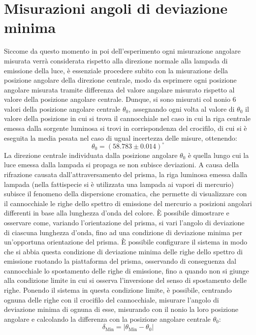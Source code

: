 \documentclass[a4paper,12pt]{article}
\begin{document}
\section{Misurazioni angoli di deviazione minima}
Siccome da questo momento in poi dell’esperimento ogni misurazione angolare misurata verrà considerata rispetto alla direzione normale alla lampada di emissione della luce, è essenziale procedere subito con la misurazione della posizione angolare della direzione centrale, modo da esprimere ogni posizione angolare misurata tramite differenza del valore angolare misurato rispetto al valore della posizione angolare centrale.
Dunque, si sono misurati col nonio 6 valori della posizione angolare centrale \( \theta_0 \), assegnando ogni volta al valore di \( \theta_0 \) il valore della posizione in cui si trova il cannocchiale nel caso in cui la riga centrale emessa dalla sorgente luminosa si trovi in corrispondenza del crocifilo, di cui si è eseguita la media pesata nel caso di ugual incertezza delle misure, ottenendo:
\[
\theta_0 = (58.783 \pm 0.014)^\circ
\]
La direzione centrale individuata dalla posizione angolare \( \theta_0 \) è quella lungo cui la luce emessa dalla lampada si propaga se non subisce deviazioni.
A causa della rifrazione causata dall’attraversamento del prisma, la riga luminosa emessa dalla lampada (nella fattispecie si è utilizzata una lampada ai vapori di mercurio) subisce il fenomeno della dispersione cromatica, che permette di visualizzare con il cannocchiale le righe dello spettro di emissione del mercurio a posizioni angolari differenti in base alla lunghezza d’onda del colore.
È possibile dimostrare e osservare come, variando l’orientazione del prisma, si vari l’angolo di deviazione di ciascuna lunghezza d’onda, fino ad una condizione di deviazione minima per un’opportuna orientazione del prisma.
È possibile configurare il sistema in modo che si abbia questa condizione di deviazione minima delle righe dello spettro di emissione ruotando la piattaforma del prisma, osservando di conseguenza dal cannocchiale lo spostamento delle righe di emissione, fino a quando non si giunge alla condizione limite in cui si osserva l’inversione del senso di spostamento delle righe.
Ponendo il sistema in questa condizione limite, è possibile, centrando ognuna delle righe con il crocifilo del cannocchiale, misurare l’angolo di deviazione minima di ognuna di esse, misurando con il nonio la loro posizione angolare e calcolando la differenza con la posizione angolare centrale \( \theta_0 \):
\[
\delta_{\text{Min}} = |\theta_{\text{Min}} - \theta_0|
\]
\end{document}
